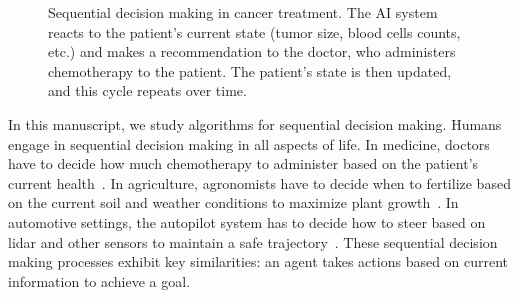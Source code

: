 \begin{figure}
    \caption{Sequential decision making in cancer treatment. The AI system reacts to the patient's current state (tumor size, blood cells counts, etc.) and makes a recommendation to the doctor, who administers chemotherapy to the patient. The patient's state is then updated, and this cycle repeats over time.}
    \label{fig:cancer-treatment-sdm}
\end{figure}
In this manuscript, we study algorithms for sequential decision making. Humans engage in sequential decision making in all aspects of life. In medicine, doctors have to decide how much chemotherapy to administer based on the patient's current health~\cite{cancer}. In agriculture, agronomists have to decide when to fertilize based on the current soil and weather conditions to maximize plant growth~\cite{agriculture}. 
In automotive settings, the autopilot system has to decide how to steer based on lidar and other sensors to maintain a safe trajectory~\cite{driving}. 
These sequential decision making processes exhibit key similarities: an agent takes actions based on current information to achieve a goal.

